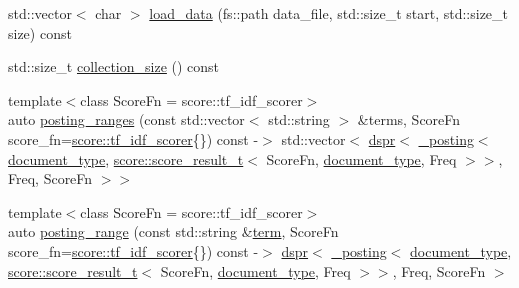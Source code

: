 \begin{DoxyCompactItemize}
std\+::vector$<$ char $>$ \mbox{\hyperlink{classirk_1_1inverted__index_a66e54902ec83c229af58f1f6b443ed0d}{load\+\_\+data}} (fs\+::path data\+\_\+file, std\+::size\+\_\+t start, std\+::size\+\_\+t size) const
\item 
std\+::size\+\_\+t \mbox{\hyperlink{classirk_1_1inverted__index_a6666e1a0c0facdec6c805abc153a9ea7}{collection\+\_\+size}} () const
\item 
{\footnotesize template$<$class Score\+Fn  = score\+::tf\+\_\+idf\+\_\+scorer$>$ }\\auto \mbox{\hyperlink{classirk_1_1inverted__index_ada3586a485b42d220669d319f6b5acc4}{posting\+\_\+ranges}} (const std\+::vector$<$ std\+::string $>$ \&terms, Score\+Fn score\+\_\+fn=\mbox{\hyperlink{structirk_1_1score_1_1tf__idf__scorer}{score\+::tf\+\_\+idf\+\_\+scorer}}\{\}) const -\/$>$ std\+::vector$<$ \mbox{\hyperlink{namespaceirk_af92c7aae439f59ccae252f027f851c24}{dspr}}$<$ \mbox{\hyperlink{structirk_1_1__posting}{\+\_\+posting}}$<$ \mbox{\hyperlink{classirk_1_1inverted__index_ab708a9d1605de705341f3ed81bd7d5e7}{document\+\_\+type}}, \mbox{\hyperlink{namespaceirk_1_1score_af4a2c84b3548a4ac12aac3862bc94875}{score\+::score\+\_\+result\+\_\+t}}$<$ Score\+Fn, \mbox{\hyperlink{classirk_1_1inverted__index_ab708a9d1605de705341f3ed81bd7d5e7}{document\+\_\+type}}, Freq $>$$>$, Freq, Score\+Fn $>$$>$
\item 
{\footnotesize template$<$class Score\+Fn  = score\+::tf\+\_\+idf\+\_\+scorer$>$ }\\auto \mbox{\hyperlink{classirk_1_1inverted__index_a95a85fe09dae6dfb47cd7bdfa8ce2a4d}{posting\+\_\+range}} (const std\+::string \&\mbox{\hyperlink{classirk_1_1inverted__index_af6d217382bf3bed6b19a009cb0274148}{term}}, Score\+Fn score\+\_\+fn=\mbox{\hyperlink{structirk_1_1score_1_1tf__idf__scorer}{score\+::tf\+\_\+idf\+\_\+scorer}}\{\}) const -\/$>$ \mbox{\hyperlink{namespaceirk_af92c7aae439f59ccae252f027f851c24}{dspr}}$<$ \mbox{\hyperlink{structirk_1_1__posting}{\+\_\+posting}}$<$ \mbox{\hyperlink{classirk_1_1inverted__index_ab708a9d1605de705341f3ed81bd7d5e7}{document\+\_\+type}}, \mbox{\hyperlink{namespaceirk_1_1score_af4a2c84b3548a4ac12aac3862bc94875}{score\+::score\+\_\+result\+\_\+t}}$<$ Score\+Fn, \mbox{\hyperlink{classirk_1_1inverted__index_ab708a9d1605de705341f3ed81bd7d5e7}{document\+\_\+type}}, Freq $>$$>$, Freq, Score\+Fn $>$
\item 
$$
\end{DoxyCompactItemize}
